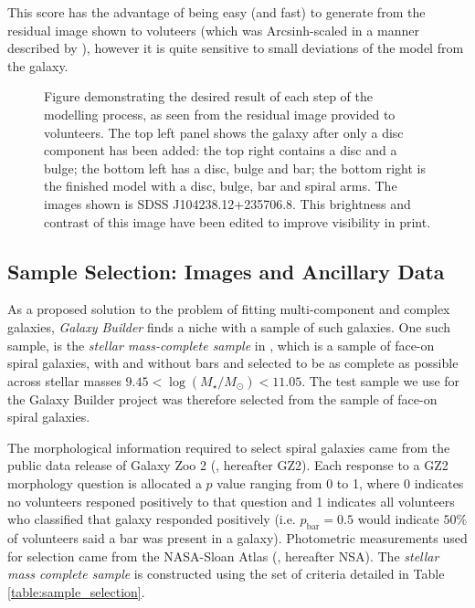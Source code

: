 \documentclass[../main.tex]{subfiles}
\begin{document}
This score has the advantage of being easy (and fast) to generate from the residual image shown to voluteers (which was Arcsinh-scaled in a manner described by \citealt{Lupton2003:astro-ph/0312483v1}), however it is quite sensitive to small deviations of the model from the galaxy.

\begin{figure}
  \caption{Figure demonstrating the desired result of each step of the modelling process, as seen from the residual image provided to volunteers. The top left panel shows the galaxy after only a disc component has been added: the top right contains a disc and a bulge; the bottom left has a disc, bulge and bar; the bottom right is the finished model with a disc, bulge, bar and spiral arms. The images shown is SDSS J104238.12+235706.8. This brightness and contrast of this image have been edited to improve visibility in print.}
  \label{fig:residualsStepByStep}
\end{figure}


\subsection{Sample Selection: Images and Ancillary Data}
\label{sec:data}

As a proposed solution to the problem of fitting multi-component and complex galaxies, \textit{Galaxy Builder} finds a niche with a sample of such galaxies. One such sample, is the \textit{stellar mass-complete sample} in \citet{2017MNRAS.472.2263H}, which is a sample of face-on spiral galaxies, with and without bars and selected to be as complete as possible across stellar masses $9.45 < \log(M_\star / M_\odot) < 11.05$. The test sample we use for the Galaxy Builder project was therefore selected from the \citet{2017MNRAS.472.2263H} sample of face-on spiral galaxies.

The morphological information required to select spiral galaxies came from the public data release of Galaxy Zoo 2 (\citealt{Willett2013:1308.3496v2}, hereafter GZ2). Each response to a GZ2 morphology question is allocated a $p$ value ranging from 0 to 1, where 0 indicates no volunteers responed positively to that question and 1 indicates all volunteers who classified that galaxy responded positively (i.e. $p_\text{bar} = 0.5$ would indicate $50\%$ of volunteers said a bar was present in a galaxy). Photometric measurements used for selection came from the NASA-Sloan Atlas (\citealt{2011AJ....142...31B}, hereafter NSA). The \textit{stellar mass complete sample} is constructed using the set of criteria detailed in Table \ref{table:sample_selection}.
\end{document}
